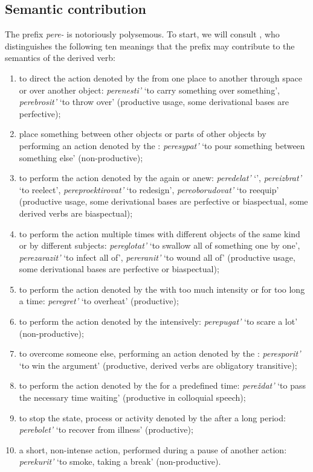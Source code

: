 \subsection{Semantic contribution}
The prefix \textit{pere-} is notoriously polysemous. To start, we will consult \citet[pp. 363--364]{Shvedova:82}, who distinguishes the following ten meanings that the prefix may contribute to the semantics of the derived verb:
\begin{enumerate}
\item to direct the action denoted by the  from one place to another through space or over another object: \textit{perenesti'} `to carry something over something', \textit{perebrosit'} `to throw over' (productive usage, some derivational bases are perfective); 
\item place something between other objects or parts of other objects by performing an action denoted by the : \textit{peresypat'} `to pour something between something else' (non-productive); 
\item to perform the action denoted by the  again or anew: \textit{peredelat'} `', \textit{pereizbrat'} `to reelect', \textit{pereproektirovat'} `to redesign', \textit{pereoborudovat'} `to reequip' (productive usage, some derivational bases are perfective or biaspectual, some derived verbs are biaspectual);
\item to perform the action multiple times with different objects of the same kind or by different subjects: \textit{pereglotat'} `to swallow all of something one by one', \textit{perezarazit'} `to infect all of', \textit{pereranit'} `to wound all of' (productive usage, some derivational bases are perfective or biaspectual);
\item to perform the action denoted by the  with too much intensity or for too long a time: \textit{peregret'} `to overheat' (productive); 
\item to perform the action denoted by the  intensively: \textit{perepugat'} `to scare a lot' (non-productive); 
\item to overcome someone else, performing an action denoted by the : \textit{peresporit'} `to win the argument' (productive, derived verbs are obligatory transitive); 
\item to perform the action denoted by the  for a predefined time: \textit{pere\v{z}dat'} `to pass the necessary time waiting' (productive in colloquial speech);
\item to stop the state, process or activity denoted by the  after a long period: \textit{perebolet'} `to recover from illness' (productive); 
\item a short, non-intense action, performed during a pause of another action: \textit{perekurit'} `to smoke, taking a break' (non-productive).
\end{enumerate} 

